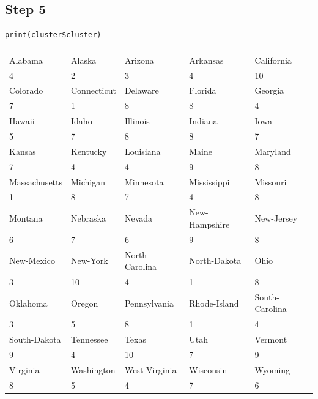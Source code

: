 \documentclass[11pt]{article}
\begin{document}
\subsection*{Step 5}
\label{sec:orgd337082}
\begin{verbatim}
print(cluster$cluster)
\end{verbatim}
\begin{center}
\begin{tabular}{lllll}
 &  &  &  & \\
Alabama & Alaska & Arizona & Arkansas & California\\
4 & 2 & 3 & 4 & 10\\
Colorado & Connecticut & Delaware & Florida & Georgia\\
7 & 1 & 8 & 8 & 4\\
Hawaii & Idaho & Illinois & Indiana & Iowa\\
5 & 7 & 8 & 8 & 7\\
Kansas & Kentucky & Louisiana & Maine & Maryland\\
7 & 4 & 4 & 9 & 8\\
Massachusetts & Michigan & Minnesota & Mississippi & Missouri\\
1 & 8 & 7 & 4 & 8\\
Montana & Nebraska & Nevada & New-Hampshire & New-Jersey\\
6 & 7 & 6 & 9 & 8\\
New-Mexico & New-York & North-Carolina & North-Dakota & Ohio\\
3 & 10 & 4 & 1 & 8\\
Oklahoma & Oregon & Pennsylvania & Rhode-Island & South-Carolina\\
3 & 5 & 8 & 1 & 4\\
South-Dakota & Tennessee & Texas & Utah & Vermont\\
9 & 4 & 10 & 7 & 9\\
Virginia & Washington & West-Virginia & Wisconsin & Wyoming\\
8 & 5 & 4 & 7 & 6\\
\end{tabular}
\end{center}
\end{document}
